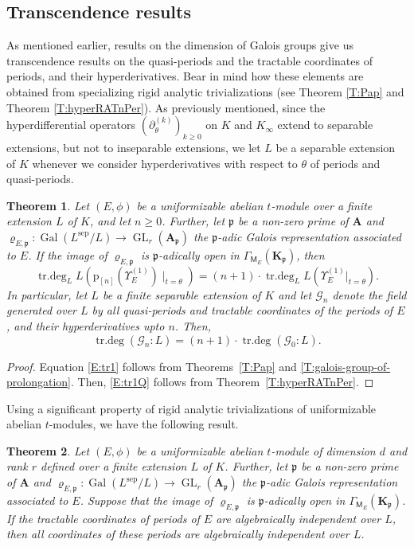 \documentclass[10pt,a4paper]{amsart}
\theoremstyle{plain} %
\newtheorem{Theorem}{Theorem}[section]
\theoremstyle{definition}
\theoremstyle{remark}
\newcommand{\fp}{\mathfrak{p}}  %
\newcommand{\bA}{\mathbf{A}}
\newcommand{\bK}{\mathbf{K}}
\newcommand{\Gal}{\operatorname{Gal}}
\newcommand{\trdeg}{\operatorname{tr.deg}}
\newcommand{\GL}{\operatorname{GL}}
\newcommand{\mot}{\mathsf{M}}  %
\newcommand{\hde}[1]{\partial^{(#1)}}  %
\newcommand{\prol}[1]{\mathrm{p}_{[#1]}}
\numberwithin{equation}{subsection}
\begin{document}
\subsection{Transcendence results}

As mentioned earlier, results on the dimension of Galois groups give us transcendence results on the quasi-periods  and the tractable coordinates of periods, and their hyperderivatives. Bear in mind how these elements are obtained from specializing rigid analytic trivializations (see Theorem \ref{T:Pap} and Theorem \ref{T:hyperRATnPer}). As previously mentioned, since the hyperdifferential operators $(\hde{k}_\theta)_{k\geq 0}$ on $K$ and $K_{\infty}$ extend to separable extensions, but not to inseparable extensions, we let $L$ be a separable extension of $K$ whenever we consider hyperderivatives with respect to $\theta$ of periods and quasi-periods. 

 
\begin{Theorem}\label{Thm:transcendence-degrees}
Let $(E,\phi)$ be a uniformizable abelian $t$-module over a finite extension $L$ of $K$, and let $n \geq 0$.   
   Further, let 
	$\fp$ be a non-zero prime of $\bA$ and $\varrho_{E,\fp}:\Gal(L^{\mathrm{sep}}/L)\to \GL_r(\bA_\fp)$ the $\fp$-adic Galois representation associated to $E$.
	If the image of $\varrho_{E,\fp}$ is $\fp$-adically open in $\Gamma_{\mot_E}(\bK_\fp)$, then 
	\begin{equation}\label{E:tr1}
	\trdeg_{L}L(\prol{n}(\Upsilon_E^{(1)}) \mid_{t=\theta}) = (n+1)\cdot \trdeg_{L}L(\Upsilon_E ^{(1)}|_{t=\theta}). 
	\end{equation}
	In particular, let $L$ be a finite separable extension of $K$ and let $\mathcal{G}_n$ denote the field generated over $L$ by all quasi-periods  and tractable coordinates of the periods of $E$, and their hyperderivatives upto $n$. Then,
    \begin{equation}\label{E:tr1Q}
        \trdeg(\mathcal{G}_n:L) = (n+1)\cdot \trdeg(\mathcal{G}_0:L). 
          \end{equation} 
\end{Theorem}

\begin{proof}
    Equation \eqref{E:tr1} follows from Theorems~\ref{T:Pap} and \ref{T:galois-group-of-prolongation}. Then, \eqref{E:tr1Q} follows from Theorem~\ref{T:hyperRATnPer}. 
\end{proof}


Using a significant property of rigid analytic trivializations of uniformizable abelian $t$-modules, we have the following result. 
\begin{Theorem}\label{Thm:periodentries}
Let $(E,\phi)$ be a uniformizable abelian $t$-module of dimension $d$ and rank $r$ defined over a finite extension $L$ of $K$.
   Further, let 
	$\fp$ be a non-zero prime of $\bA$ and $\varrho_{E,\fp}:\Gal(L^{\mathrm{sep}}/L)\to \GL_r(\bA_\fp)$ the $\fp$-adic Galois representation associated to $E$. Suppose that the image of $\varrho_{E,\fp}$ is $\fp$-adically open in $\Gamma_{\mot_E}(\bK_\fp)$. If the tractable coordinates of periods of $E$ are algebraically independent over $L$, then all coordinates of these periods are algebraically independent over $L$.
\end{Theorem}
\end{document}
